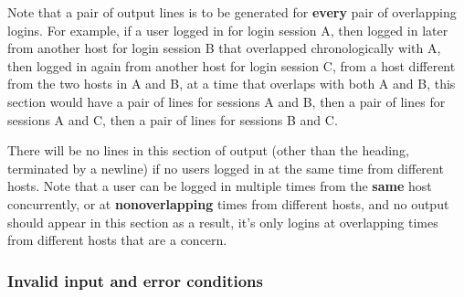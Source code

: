 \documentclass[11pt]{article}
\begin{document}
        Note that a pair of output lines is to be generated for \textbf{every}
      pair of overlapping logins.  For example, if a user logged in for
      login session A, then logged in later from another host for login
      session B that overlapped chronologically with A, then logged in again
      from another host for login session C, from a host different from the
      two hosts in A and B, at a time that overlaps with both A and B, this
      section would have a pair of lines for sessions A and B, then a pair
      of lines for sessions A and C, then a pair of lines for sessions B and
      C.

        There will be no lines in this section of output (other than the
      heading, terminated by a newline) if no users logged in at the same
      time from different hosts.  Note that a user can be logged in multiple
      times from the \textbf{same} host concurrently, or at
      \textbf{nonoverlapping} times from different hosts, and no output
      should appear in this section as a result, it's only logins at
      overlapping times from different hosts that are a concern.

      \subsubsection{Invalid input and error conditions}

        \vspace{0mm}
\end{document}
